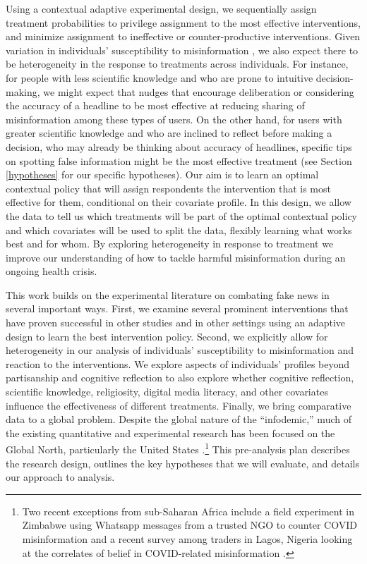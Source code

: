 \documentclass[letterpaper, 12pt, parskip=full,DIV=10]{scrartcl}
\begin{document}
Using a contextual adaptive experimental design, we sequentially assign treatment probabilities to privilege assignment to the most effective interventions, and minimize assignment to ineffective or counter-productive interventions. Given variation in individuals' susceptibility to misinformation \citep{wittenberg2020misinformation}, we also expect there to be heterogeneity in the response to treatments across individuals. {For instance, for people with less scientific knowledge and who are prone to intuitive decision-making, we might expect that nudges that encourage deliberation or considering the accuracy of a headline to be most effective at reducing sharing of misinformation among these types of users. On the other hand, for users with greater scientific knowledge and who are inclined to reflect before making a decision, who may already be thinking about accuracy of headlines, specific tips on spotting false information might be the most effective treatment} (see Section \ref{hypotheses}
for our specific hypotheses).  Our aim is to learn an optimal contextual policy that will assign respondents the intervention that is most effective for them, conditional on their covariate profile. In this design, we allow the data to tell us which treatments will be part of the optimal contextual policy and which covariates will be used to split the data, flexibly learning what works best and for whom. By exploring heterogeneity in response to treatment we improve our understanding of how to tackle harmful misinformation during an ongoing health crisis. 


This work builds on the experimental literature on combating fake news in several important ways. First, we examine several prominent interventions that have proven successful in other studies and in other settings using an adaptive design to learn the best intervention policy. Second, we explicitly allow for heterogeneity in our analysis of individuals' susceptibility to misinformation and reaction to the interventions. We explore aspects of individuals' profiles beyond partisanship and cognitive reflection to also explore whether cognitive reflection, scientific knowledge, religiosity, digital media literacy, and other covariates influence the effectiveness of different treatments. Finally, we bring comparative data to a global problem. Despite the global nature of the ``infodemic,'' much of the existing quantitative and experimental research has been focused on the Global North, particularly the United States \citep{pennycook2020fighting, bursztyn2020misinformation}.\footnote{Two recent exceptions from sub-Saharan Africa include a field experiment in Zimbabwe using Whatsapp messages from a trusted NGO to counter COVID misinformation \citep{bowles2020center} and a recent survey among traders in Lagos, Nigeria looking at the correlates of belief in COVID-related misinformation \citep{Grossman2020}.} This pre-analysis plan describes the research design, outlines the key hypotheses that we will evaluate, and details our approach to analysis.
\end{document}
